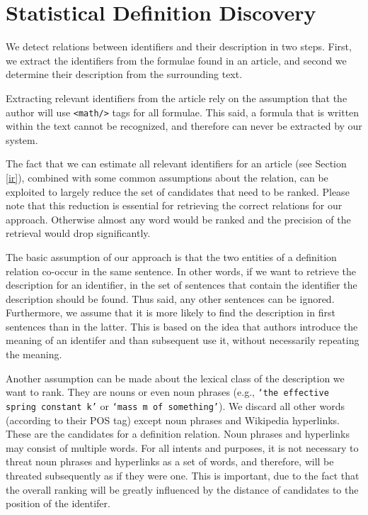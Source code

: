 \documentclass[runningheads]{llncs}
\begin{document}
\section{Statistical Definition Discovery}

We detect relations between identifiers and their description in two steps.
First, we extract the identifiers from the formulae found in an article, and
second we determine their description from the surrounding text.

Extracting relevant identifiers from the article rely on the assumption that
the author will use \texttt{<math/>} tags for all formulae. This said, a
formula that is written within the text cannot be recognized, and therefore
can never be extracted by our system.

The fact that we can estimate all relevant identifiers for an article (see
Section \ref{ir}), combined with some common assumptions about the relation,
can be exploited to largely reduce the set of candidates that need to be
ranked. Please note that this reduction is essential for retrieving the
correct relations for our approach. Otherwise almost any word would be ranked
and the precision of the retrieval would drop significantly.

The basic assumption of our approach is that the two entities of a definition
relation co-occur in the same sentence. In other words, if we want to retrieve
the description for an identifier, in the set of sentences that contain the
identifier the description should be found. Thus said, any other sentences can
be ignored. Furthermore, we assume that it is more likely to find the
description in first sentences than in the latter. This is based on the idea
that authors introduce the meaning of an identifer and than subsequent use it,
without necessarily repeating the meaning.

Another assumption can be made about the lexical class of the description we
want to rank. They are nouns or even noun phrases (e.g., \texttt{`the
effective spring constant k'} or \texttt{`mass m of something'}). We discard
all other words (according to their POS tag) except noun phrases and Wikipedia
hyperlinks. These are the candidates for a definition relation. Noun phrases
and hyperlinks may consist of multiple words. For all intents and purposes, it
is not necessary to threat noun phrases and hyperlinks as a set of words, and
therefore, will be threated subsequently as if they were one. This is
important, due to the fact that the overall ranking will be greatly influenced
by the distance of candidates to the position of the identifer.
\end{document}
